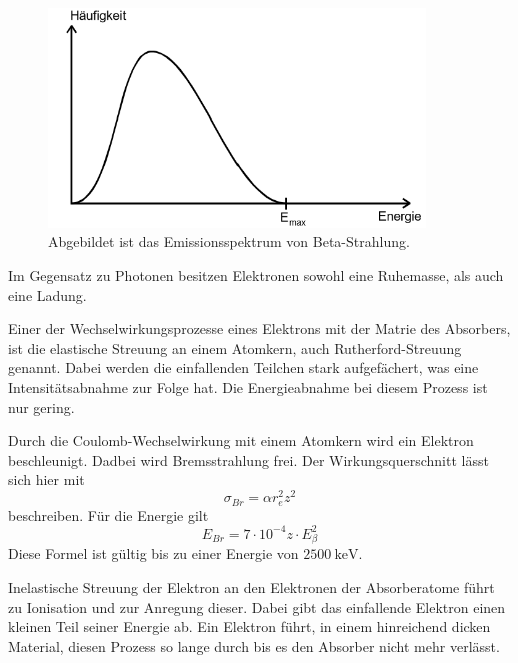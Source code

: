 \begin{figure}[H]
    \centering
    \includegraphics[width=10cm]{Bilder/Beta.png}
    \caption{Abgebildet ist das Emissionsspektrum von Beta-Strahlung.}
    \label{fig:Beta}
\end{figure}
Im Gegensatz zu Photonen besitzen Elektronen sowohl eine Ruhemasse, als auch eine Ladung.

Einer der Wechselwirkungsprozesse eines Elektrons mit der Matrie des Absorbers, ist die elastische Streuung an einem Atomkern, auch Rutherford-Streuung genannt.
Dabei werden die einfallenden Teilchen stark aufgefächert, was eine Intensitätsabnahme zur Folge hat.
Die Energieabnahme bei diesem Prozess ist nur gering.  

Durch die Coulomb-Wechselwirkung mit einem Atomkern wird ein Elektron beschleunigt.
Dadbei wird Bremsstrahlung frei.
Der Wirkungsquerschnitt lässt sich hier mit
\begin{equation}
    \sigma_{Br}=\alpha r_e^2 z^2
    \label{eqn:brems}
\end{equation}
beschreiben.
Für die Energie gilt
\begin{equation}
    E_{Br}=7\cdot10^{-4}z\cdot E_\beta^2
    \label{eqn:brems2}
\end{equation}
Diese Formel ist gültig bis zu einer Energie von $\qty{2500}{\kilo\electronvolt}$.
  
Inelastische Streuung der Elektron an den Elektronen der Absorberatome führt zu Ionisation und zur Anregung dieser.
Dabei gibt das einfallende Elektron einen kleinen Teil seiner Energie ab.
Ein Elektron führt, in einem hinreichend dicken Material, diesen Prozess so lange durch bis es den Absorber nicht mehr verlässt.
  
